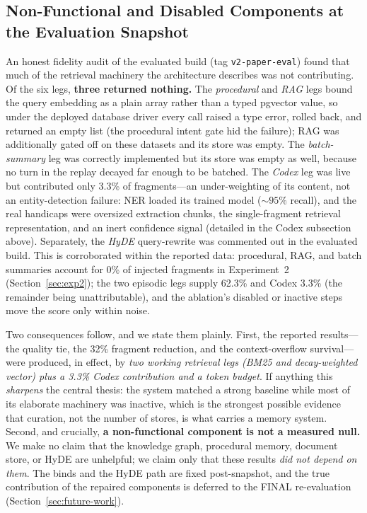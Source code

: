 \documentclass[10pt]{article}
\begin{document}
\subsection{Non-Functional and Disabled Components at the Evaluation Snapshot}
An honest fidelity audit of the evaluated build (tag \texttt{v2-paper-eval}) found that much of the retrieval machinery the architecture describes was not contributing. Of the six legs, \textbf{three returned nothing.} The \emph{procedural} and \emph{RAG} legs bound the query embedding as a plain array rather than a typed pgvector value, so under the deployed database driver every call raised a type error, rolled back, and returned an empty list (the procedural intent gate hid the failure); RAG was additionally gated off on these datasets and its store was empty. The \emph{batch-summary} leg was correctly implemented but its store was empty as well, because no turn in the replay decayed far enough to be batched. The \emph{Codex} leg was live but contributed only 3.3\% of fragments---an under-weighting of its content, not an entity-detection failure: NER loaded its trained model (${\sim}95\%$ recall), and the real handicaps were oversized extraction chunks, the single-fragment retrieval representation, and an inert confidence signal (detailed in the Codex subsection above). Separately, the \emph{HyDE} query-rewrite was commented out in the evaluated build. This is corroborated within the reported data: procedural, RAG, and batch summaries account for 0\% of injected fragments in Experiment~2 (Section~\ref{sec:exp2}); the two episodic legs supply 62.3\% and Codex 3.3\% (the remainder being unattributable), and the ablation's disabled or inactive steps move the score only within noise.

Two consequences follow, and we state them plainly. First, the reported results---the quality tie, the 32\% fragment reduction, and the context-overflow survival---were produced, in effect, by \emph{two working retrieval legs (BM25 and decay-weighted vector) plus a 3.3\% Codex contribution and a token budget}. If anything this \emph{sharpens} the central thesis: the system matched a strong baseline while most of its elaborate machinery was inactive, which is the strongest possible evidence that curation, not the number of stores, is what carries a memory system. Second, and crucially, \textbf{a non-functional component is not a measured null.} We make no claim that the knowledge graph, procedural memory, document store, or HyDE are unhelpful; we claim only that these results \emph{did not depend on them}. The binds and the HyDE path are fixed post-snapshot, and the true contribution of the repaired components is deferred to the FINAL re-evaluation (Section~\ref{sec:future-work}).
\end{document}

